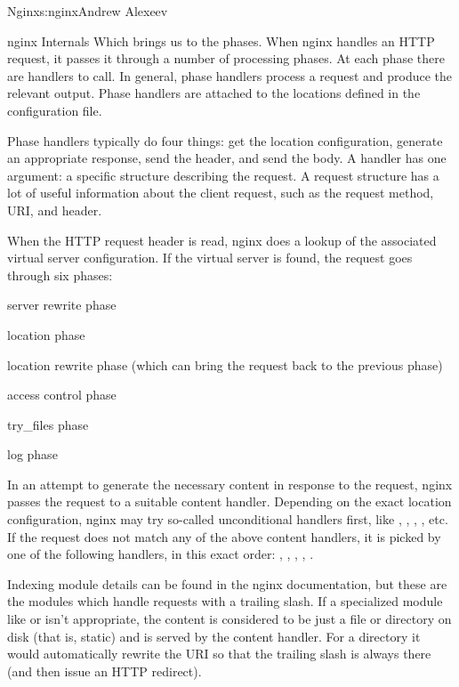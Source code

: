 \begin{aosachapter}{Nginx}{s:nginx}{Andrew Alexeev}
\begin{aosasect1}{nginx Internals}
Which brings us to the phases. When nginx handles an HTTP request, it
passes it through a number of processing phases. At each phase there
are handlers to call. In general, phase handlers process a request and
produce the relevant output. Phase handlers are attached to the
locations defined in the configuration file.

Phase handlers typically do four things: get the location
configuration, generate an appropriate response, send the header, and
send the body. A handler has one argument: a specific structure
describing the request. A request structure has a lot of useful
information about the client request, such as the request method, URI,
and header.

When the HTTP request header is read, nginx does a lookup of the
associated virtual server configuration. If the virtual server is
found, the request goes through six phases:

\begin{aosaenumerate}

\item server rewrite phase

\item location phase

\item location rewrite phase (which can bring the request back to the
previous phase)

\item access control phase

\item try\_files phase

\item log phase

\end{aosaenumerate}

In an attempt to generate the necessary content in response to the
request, nginx passes the request to a suitable content
handler. Depending on the exact location configuration, nginx may try
so-called unconditional handlers first, like ,
, , , etc. If the request does
not match any of the above content handlers, it is picked by one of
the following handlers, in this exact order: ,
, , , .

Indexing module details can be found in the nginx documentation, but
these are the modules which handle requests with a trailing slash. If
a specialized module like  or  isn't
appropriate, the content is considered to be just a file or directory
on disk (that is, static) and is served by the  content
handler. For a directory it would automatically rewrite the URI so
that the trailing slash is always there (and then issue an HTTP
redirect).


\end{aosasect1}
\end{aosachapter}

